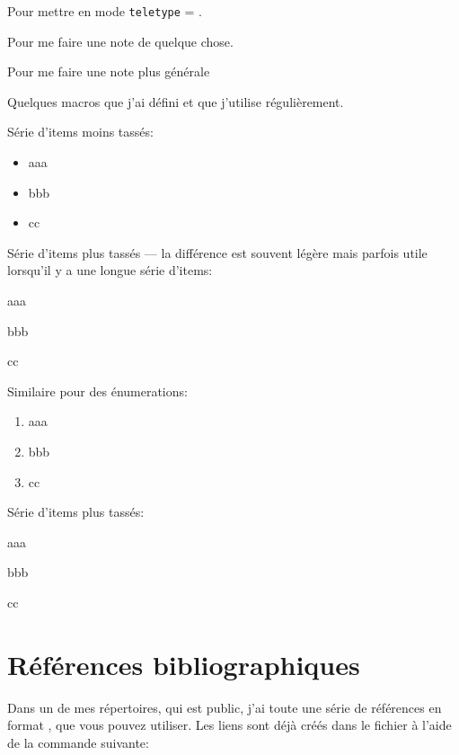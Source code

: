 Pour mettre en mode {\tt teletype} = .

Pour me faire une note de quelque chose\ACOMPLETER.

Pour me faire une note plus g\'en\'erale

Quelques macros que j'ai d\'efini et que j'utilise r\'eguli\`erement.

S\'erie d'items moins tass\'es:
\begin{itemize}
\item aaa
\item bbb
\item cc
\end{itemize}

S\'erie d'items plus tass\'es --- la diff\'erence est souvent
l\'eg\`ere mais parfois utile lorsqu'il y a une longue s\'erie
d'items:
\begin{Items}
\item aaa
\item bbb
\item cc
\end{Items}

Similaire pour des \'enumerations:
\begin{enumerate}
\item aaa
\item bbb
\item cc
\end{enumerate}

S\'erie d'items plus tass\'es:
\begin{Enum}
\item aaa
\item bbb
\item cc
\end{Enum}


\section{R\'ef\'erences bibliographiques}

Dans un de mes r\'epertoires, qui est public, j'ai toute une s\'erie
de r\'ef\'erences en format , que vous pouvez utiliser. Les
liens sont d\'ej\`a cr\'e\'es dans le fichier  \`a
l'aide de la commande suivante:
\begin{verbatim}

\end{verbatim}

